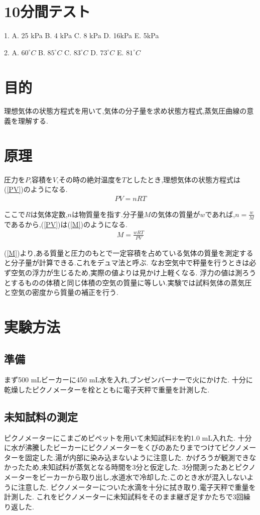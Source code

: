 \documentclass[a4j,10pt]{jarticle}
\begin{document}
  \section{10分間テスト}
  1. A. 25 kPa B. 4 kPa C. 8 kPa D. 16kPa E. 5kPa

  2. A. $60^\circ C$  B. $85^\circ C$ C. $83^\circ C$ D. $73^\circ C$ E. $81^\circ C$
  \section{目的}
  理想気体の状態方程式を用いて,気体の分子量を求め状態方程式,蒸気圧曲線の意義を理解する.
  \section{原理}
  圧力を$P$,容積を$V$,その時の絶対温度を$T$としたとき,理想気体の状態方程式は(\ref{PV})のようになる.
  \begin{eqnarray}
    \label{PV}
    PV = nRT
  \end{eqnarray}

  ここで$R$は気体定数,$n$は物質量を指す.分子量$M$の気体の質量が$w$であれば,$n = \frac{w}{M}$であるから,(\ref{PV})は(\ref{M})のようになる.
  \begin{eqnarray}
    \label{M}
    M = \frac{wRT}{PV}
  \end{eqnarray}

  (\ref{M})より,ある質量と圧力のもとで一定容積を占めている気体の質量を測定すると分子量が計算できる.これをデュマ法と呼ぶ.
  なお空気中で秤量を行うときは必ず空気の浮力が生じるため,実際の値よりは見かけ上軽くなる.
  浮力の値は測ろうとするものの体積と同じ体積の空気の質量に等しい.実験では試料気体の蒸気圧と空気の密度から質量の補正を行う.

  \section{実験方法}
  \subsection{準備}
  まず500 mLビーカーに450 mL水を入れ,ブンゼンバーナーで火にかけた.
  十分に乾燥したピクノメーターを栓とともに電子天秤で重量を計測した.
  \subsection{未知試料の測定}
  ピクノメーターにこまごめピペットを用いて未知試料Eを約1.0 mL入れた.
  十分に水が沸騰したビーカーにピクノメーターをくびのあたりまでつけてピクノメーターを固定した.湯が内部に染み込まないように注意した.
  かげろうが観測できなかったため,未知試料が蒸気となる時間を3分と仮定した.
  3分間測ったあとピクノメーターをビーカーから取り出し,水道水で冷却した.このとき水が混入しないように注意した.
  ピクノメーターについた水滴を十分に拭き取り,電子天秤で重量を計測した.
  これをピクノメーターに未知試料をそのまま継ぎ足すかたちで3回繰り返した.
\end{document}
